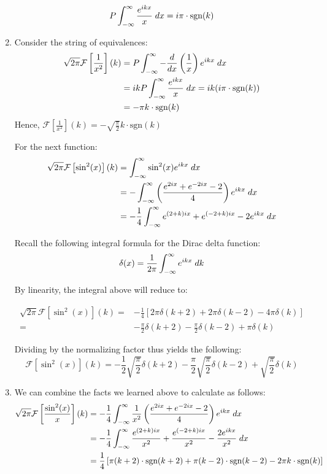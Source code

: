 \documentclass[12pt]{article}%
\newcommand{\foutrans}[1]{\mathcal{F}\left[{#1}\right](k)}
\newcommand{\sgn}[1]{\text{sgn}({#1}) }
\begin{document}
\begin{enumerate}
\[P \doubinfint \frac{e^{ikx}}{x} \; dx = i\pi\cdot\sgn{k}\]


\item

Consider the string of equivalences:
\begin{align*}
  \sqrt{2\pi}\mathcal{F}\left[\frac{1}{x^2}\right](k) & = P\doubinfint - \frac{d}{dx}\left(\frac{1}{x}\right) e^{ikx} \; dx \\
  & = ik P \doubinfint \frac{e^{ikx}}{x} \; dx = ik(i\pi\cdot\sgn{k}) \\
  & = -\pi k \cdot \sgn{k}
\end{align*}
Hence, $\mathcal{F}\left[\frac{1}{x^2}\right](k) =  -\sqrt{\frac{\pi}{2}}k\cdot \sgn{k}$

For the next function:
\begin{align*}
\sqrt{2\pi}\mathcal{F}\left[\sin^2(x)\right](k)
& = \int_{-\infty}^{\infty} \sin^2(x) e^{ikx} \; dx \\
& = - \int_{-\infty}^{\infty} \left(\frac{e^{2ix} + e^{-2ix} -2 }{4}\right)e^{ikx} \; dx \\
& = - \frac{1}{4} \int_{-\infty}^{\infty} e^{(2+k)ix} + e^{(-2+k)ix} - 2e^{ikx} \; dx
\end{align*}

Recall the following integral formula for the Dirac delta function:
\[ \delta(x) = \frac{1}{2\pi}\int_{-\infty}^{\infty} e^{ikx} \; dk\]

By linearity, the integral above will reduce to:

\begin{align*}
\sqrt{2\pi}\mathcal{F}\left[\sin^2(x)\right](k)= & -\frac{1}{4} \left[2\pi \delta(k+2) + 2\pi \delta(k-2) - 4\pi \delta(k)\right] \\
= & -\frac{\pi}{2} \delta(k+2) - \frac{\pi}{2} \delta(k - 2) + \pi\delta(k)
\end{align*}

Dividing by the normalizing factor thus yields the following:
\[\mathcal{F}\left[\sin^2(x)\right](k)=-\frac{1}{2}\sqrt{\frac{\pi}{2}} \delta(k+2) - \frac{\pi}{2}\sqrt{\frac{\pi}{2}}  \delta(k - 2) + \sqrt{\frac{\pi}{2}} \delta(k) \]

\item
We can combine the facts we learned above to calculate as follows:
\begin{align*}
    \sqrt{2\pi}\foutrans{\frac{\sin^2(x)}{x}} & = - \frac{1}{4} \doubinfint \frac{1}{x^2} \left(\frac{e^{2ix} + e^{-2ix} -2}{4}\right)e^{ikx} \; dx \\
    & = -\frac{1}{4} \doubinfint \frac{e^{(2+k)ix}}{x^2} + \frac{e^{(-2+k)ix}}{x^2} - \frac{2e^{ikx}}{x^2} \; dx \\
    & = \frac{1}{4} \left[ \pi(k+2)\cdot \sgn{k+2} + \pi(k-2)\cdot \sgn{k-2} - 2\pi k \cdot \sgn{k}\right]
\end{align*}


\end{enumerate}
\end{document}
